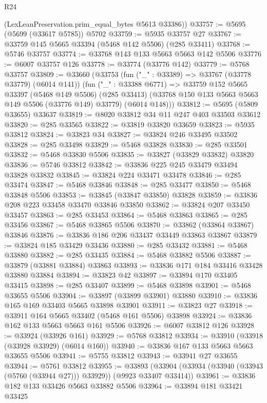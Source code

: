 \begin{lexlean}{R24}
\begin{coremodule}
      (LexLeanPreservation.prim_equal_bytes @5613 @33386))
@33757 := @5695 (@5699 (@33617 @5785)) @5702
@33759 := @5935 @33757 @27
@33767 := @33759 @145 @5665 @33394 (@5468 @142 @5506) (@285 @33411)
@33768 := @5746 @33757
@33774 := @33768 @143 @133 @5663 @5663 @142 @5506
@33776 := @6007 @33757 @126
@33778 := @33774 (@33776 @142)
@33779 := @5768 @33757
@33809 := @33660
    (@33753
      (fun ("_" : @33389) => @33767 (@33778 @33779) (@6014 @141))
      (fun ("_" : @33388 @6771) =>
      @33759
        @152
        @5665
        @33397
        (@5468 @149 @5506)
        (@285 @33413)
        (@33768 @150 @133 @5663 @5663 @149 @5506 (@33776 @149) @33779)
        (@6014 @148)))
@33812 := @5695 (@5809 @33655) @33637
@33819 := @8020 @33812 @34 @11 @247 @403 @33503 @33612
@33820 := @285 @33565
@33822 := @33819 @33820 @33659
@33823 := @5935 @33812
@33824 := @33823 @34
@33827 := @33824 @246 @33495 @33502
@33828 := @285 @33498
@33829 := @5468 @33828
@33830 := @285 @33501
@33832 := @5468 @33830 @5506
@33835 := @33827 (@33829 @33832) @33820
@33836 := @5746 @33812
@33842 := @33836 @225 @245 @33479 @33494 @33828 @33832
@33845 := @33824 @224 @33471 @33478
@33846 := @285 @33474
@33847 := @5468 @33846
@33848 := @285 @33477
@33850 := @5468 @33848 @5506
@33853 := @33845 (@33847 @33850) @33828
@33859 := @33836 @208 @223 @33458 @33470 @33846 @33850
@33862 := @33824 @207 @33450 @33457
@33863 := @285 @33453
@33864 := @5468 @33863
@33865 := @285 @33456
@33867 := @5468 @33865 @5506
@33870 := @33862 (@33864 @33867) @33846
@33876 := @33836 @186 @206 @33437 @33449 @33863 @33867
@33879 := @33824 @185 @33429 @33436
@33880 := @285 @33432
@33881 := @5468 @33880
@33882 := @285 @33435
@33884 := @5468 @33882 @5506
@33887 := @33879 (@33881 @33884) @33863
@33893 := @33836 @171 @184 @33416 @33428 @33880 @33884
@33894 := @33823 @42
@33897 := @33894 @170 @33405 @33415
@33898 := @285 @33407
@33899 := @5468 @33898
@33901 := @5468 @33655 @5506
@33904 := @33897 (@33899 @33901) @33880
@33910 := @33836 @165 @169 @33403 @5665 @33898 @33901
@33911 := @33823 @27
@33918 := @33911 @164 @5665 @33402 (@5468 @161 @5506) @33898
@33924 := @33836 @162 @133 @5663 @5663 @161 @5506
@33926 := @6007 @33812 @126
@33928 := @33924 (@33926 @161)
@33929 := @5768 @33812
@33934 := @33910 (@33918 (@33928 @33929) (@6014 @160))
@33940 := @33836 @167 @133 @5663 @5663 @33655 @5506
@33941 := @5755 @33812
@33943 := @33941 @27 @33655
@33944 := @5761 @33812
@33955 := @33893
    (@33904 (@33934 (@33940 (@33943 (@5760 (@33944 @27))) @33929)) (@9923 @33407 @33414))
@33961 := @33836 @182 @133 @33426 @5663 @33882 @5506
@33964 := @33894 @181 @33421 @33425

\end{coremodule}
\end{lexlean}
